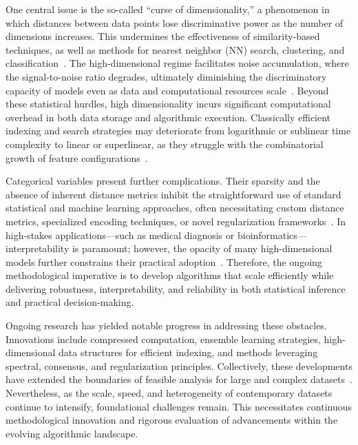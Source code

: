 \documentclass[sigconf]{acmart}
\begin{document}
One central issue is the so-called ``curse of dimensionality,'' a phenomenon in which distances between data points lose discriminative power as the number of dimensions increases. This undermines the effectiveness of similarity-based techniques, as well as methods for nearest neighbor (NN) search, clustering, and classification~\cite{ref1,ref5,ref12,ref36,ref76,ref110}. The high-dimensional regime facilitates noise accumulation, where the signal-to-noise ratio degrades, ultimately diminishing the discriminatory capacity of models even as data and computational resources scale~\cite{ref12,ref36,ref39,ref46}. Beyond these statistical hurdles, high dimensionality incurs significant computational overhead in both data storage and algorithmic execution. Classically efficient indexing and search strategies may deteriorate from logarithmic or sublinear time complexity to linear or superlinear, as they struggle with the combinatorial growth of feature configurations~\cite{ref2,ref5,ref32,ref43,ref90}.

Categorical variables present further complications. Their sparsity and the absence of inherent distance metrics inhibit the straightforward use of standard statistical and machine learning approaches, often necessitating custom distance metrics, specialized encoding techniques, or novel regularization frameworks~\cite{ref39,ref52,ref71,ref72,ref73,ref93}. In high-stakes applications—such as medical diagnosis or bioinformatics—interpretability is paramount; however, the opacity of many high-dimensional models further constrains their practical adoption~\cite{ref11,ref37,ref46,ref96,ref110}. Therefore, the ongoing methodological imperative is to develop algorithms that scale efficiently while delivering robustness, interpretability, and reliability in both statistical inference and practical decision-making.

Ongoing research has yielded notable progress in addressing these obstacles. Innovations include compressed computation, ensemble learning strategies, high-dimensional data structures for efficient indexing, and methods leveraging spectral, consensus, and regularization principles. Collectively, these developments have extended the boundaries of feasible analysis for large and complex datasets~\cite{ref39,ref46,ref52,ref76,ref93,ref110}. Nevertheless, as the scale, speed, and heterogeneity of contemporary datasets continue to intensify, foundational challenges remain. This necessitates continuous methodological innovation and rigorous evaluation of advancements within the evolving algorithmic landscape.
\end{document}

